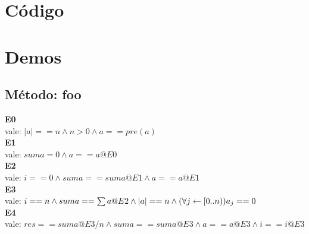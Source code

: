 \documentclass[a4paper]{article}
\begin{document}

\fecha{\today}


\maketitle

\section{C\'odigo}

\section{Demos}
    \subsection{M\'etodo: foo}
        \noindent
        \textbf{E0}\\
        vale: $|a| == n \land n > 0 \land a == pre(a)$ \\
        \textbf{E1}\\
         vale: $suma = 0 \land a == a@E0$ \\
        \textbf{E2}\\ 
        vale: $i == 0 \land suma == suma @E1 \land a == a@E1$ \\
        \textbf{E3}\\ 
        vale: $i == n \land suma == \sum a@E2 \land |a| == n \land  (\forall j \leftarrow [0\mathrm{..} n)) a_j == 0$\\
        \textbf{E4}\\ 
        vale: $res == suma@E3 / n \land suma == suma@E3 \land a == a@E3 \land i == i@E3$  \\
\end{document}
